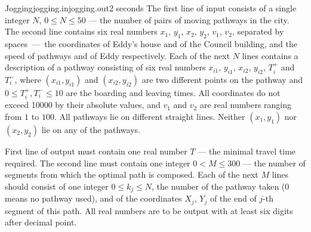 \begin{problem}{Jogging}{jogging.in}{jogging.out}{2 seconds}
The first line of input consists of a single integer $N$, $0\leq N\leq 50$ --- 
the number of pairs of moving pathways in the city. The second 
line contains six real numbers $x_1$, $y_1$, $x_2$, $y_2$, $v_1$, $v_2$, 
separated by spaces~---~the coordinates of Eddy's house and of the Council 
building, and the speed of pathways and of Eddy respectively. 
Each of the next $N$ lines contains a description of a pathway 
consisting of six real numbers 
$x_{i1}$, $y_{i1}$, $x_{i2}$, $y_{i2}$, $T^+_i$ and 
$T^-_i$, where $(x_{i1},y_{i1})$ and $(x_{i2},y_{i2})$ are two different 
points on the pathway and $0\leq T^+_i,T^-_i\leq10$ are the boarding and 
leaving times. 
All coordinates do not exceed 10000 by their absolute values, and 
$v_1$ and $v_2$ are real numbers ranging from $1$ to $100$. 
All pathways lie on different straight lines. 
Neither $(x_1,y_1)$ nor $(x_2,y_2)$ lie on any of the pathways.

\OutputFile

First line of output must contain one real number $T$ --- the 
minimal travel time required. The second line must contain 
one integer $0<M\leq 300$ --- 
the number of segments from which the optimal path is composed. 
Each of the next $M$ lines should consist of one integer $0\leq k_j\leq N$, 
the number of the pathway taken (0 means no pathway used), and of 
the coordinates $X_j$, $Y_j$ of the end of $j$-th segment of this path.
All real numbers are to be output with at least six digits after decimal point.

\Example

\begin{example}[*\stretchin{1cm}]
%
\end{example}

\end{problem}
